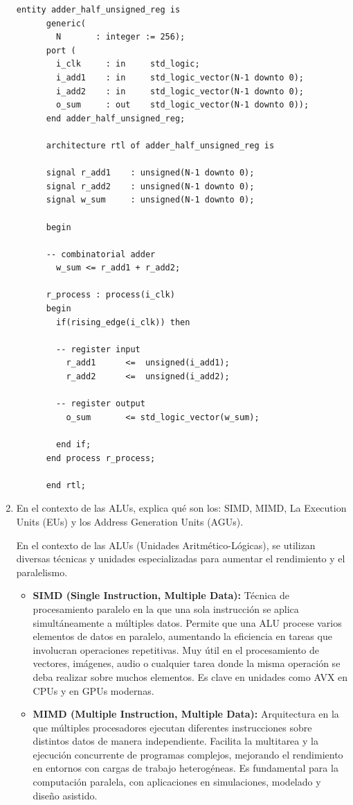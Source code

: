 \documentclass[12pt,letterpaper]{article}
\begin{document}
\begin{enumerate}
\begin{lstlisting}[style=vhdlstyle, caption={Código VHDL - Medio Sumador}]
      entity adder_half_unsigned_reg is
      generic(
        N       : integer := 256);
      port (
        i_clk     : in     std_logic;
        i_add1    : in     std_logic_vector(N-1 downto 0);
        i_add2    : in     std_logic_vector(N-1 downto 0);
        o_sum     : out    std_logic_vector(N-1 downto 0));
      end adder_half_unsigned_reg;

      architecture rtl of adder_half_unsigned_reg is

      signal r_add1    : unsigned(N-1 downto 0);
      signal r_add2    : unsigned(N-1 downto 0);
      signal w_sum     : unsigned(N-1 downto 0);

      begin

      -- combinatorial adder
        w_sum <= r_add1 + r_add2;

      r_process : process(i_clk)
      begin
        if(rising_edge(i_clk)) then
      
        -- register input
          r_add1      <=  unsigned(i_add1);
          r_add2      <=  unsigned(i_add2);
      
        -- register output
          o_sum       <= std_logic_vector(w_sum);
      
        end if;
      end process r_process;

      end rtl;
    \end{lstlisting}
    \bigskip
  \item En el contexto de las ALUs, explica qu\'{e} son los: SIMD, MIMD, La Execution Units (EUs) y
los Address Generation Units (AGUs).
    
    \bigskip
    En el contexto de las ALUs (Unidades Aritmético-Lógicas), se utilizan diversas técnicas y unidades especializadas para aumentar el rendimiento y el paralelismo.
    \begin{itemize}
    \item \textbf{SIMD (Single Instruction, Multiple Data):} Técnica de procesamiento paralelo en la que una sola instrucción se aplica simultáneamente a múltiples datos. Permite que una ALU procese varios elementos de datos en paralelo, aumentando la eficiencia en tareas que involucran operaciones repetitivas. Muy útil en el procesamiento de vectores, imágenes, audio o cualquier tarea donde la misma operación se deba realizar sobre muchos elementos. Es clave en unidades como AVX en CPUs y en GPUs modernas.
    
    \item \textbf{MIMD (Multiple Instruction, Multiple Data):} Arquitectura en la que múltiples procesadores ejecutan diferentes instrucciones sobre distintos datos de manera independiente. Facilita la multitarea y la ejecución concurrente de programas complejos, mejorando el rendimiento en entornos con cargas de trabajo heterogéneas. Es fundamental para la computación paralela, con aplicaciones en simulaciones, modelado y diseño asistido.


\end{itemize}
\end{enumerate}
\end{document}
